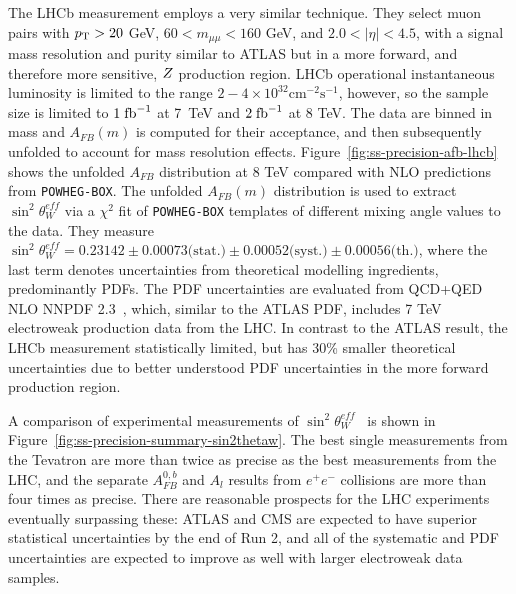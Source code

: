The LHCb measurement employs a very similar technique.  They select
muon pairs with $p_{\mathrm{T}} > 20$ GeV, $60 < m_{\mu\mu} < 160$ GeV, and $2.0 <
|\eta| < 4.5$, with a signal mass resolution and purity similar to
ATLAS but in a more forward, and therefore more sensitive, $Z$
production region.  LHCb operational instantaneous luminosity is
limited to the range $2-4\times
10^{32}\textrm{cm}^{-2}\textrm{s}^{-1}$, however, so the sample size
is limited to $1\;\mbox{fb}^{-1}$ at 7~TeV and $2\;\mbox{fb}^{-1}$
at 8 TeV.  The data are binned in mass and $A_{FB}(m)$ is computed for
their acceptance, and then subsequently unfolded to account for mass
resolution effects. Figure~\ref{fig:ss-precision-afb-lhcb} shows the
unfolded $A_{FB}$ distribution at 8 TeV compared with NLO predictions
from \texttt{POWHEG-BOX}.  The unfolded $A_{FB}(m)$ distribution is
used to extract $\sin^2\theta^{eff}_{W}$ via a $\chi^2$ fit
of \texttt{POWHEG-BOX} templates of different mixing angle values to
the data.  They measure $\sin^2\theta^{eff}_{W} = 0.23142 \pm
0.00073 \textrm{(stat.)} \pm 0.00052 \textrm{(syst.)} \pm
0.00056 \textrm{(th.)}$, where the last term denotes uncertainties
from theoretical modelling ingredients, predominantly PDFs.  The PDF
uncertainties are evaluated from QCD+QED NLO NNPDF
2.3~\cite{Ball:2013hta,Ball:2012cx}, which, similar to the ATLAS PDF,
includes 7 TeV electroweak production data from the LHC.  In contrast
to the ATLAS result, the LHCb measurement statistically limited, but
has 30\% smaller theoretical uncertainties due to better understood
PDF uncertainties in the more forward production region.

A comparison of experimental measurements of
$\sin^2\theta^{eff}_{W}$~\cite{Aaltonen:2016nuy} is shown in
Figure~\ref{fig:ss-precision-summary-sin2thetaw}.  The best single
measurements from the Tevatron are more than twice as precise as the
best measurements from the LHC, and the separate $A^{0,b}_{FB}$ and
$A_{l}$ results from $e^+e^-$ collisions are more than four times as
precise.  There are reasonable prospects for the LHC experiments
eventually surpassing these: ATLAS and CMS are expected to have
superior statistical uncertainties by the end of Run 2, and all of the
systematic and PDF uncertainties are expected to improve as well with
larger electroweak data samples.

